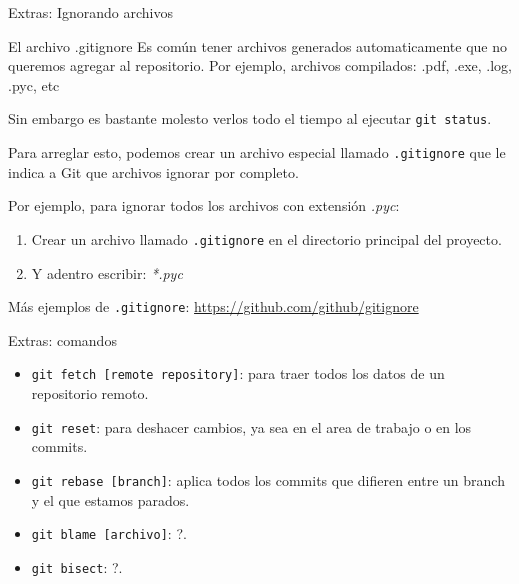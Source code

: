 \begin{frame}[t]{Extras: Ignorando archivos}

    \begin{block}{El archivo .gitignore}
      Es común tener archivos generados automaticamente que no queremos agregar al repositorio. Por ejemplo, archivos compilados: .pdf, .exe, .log, .pyc, etc

      Sin embargo es bastante molesto verlos todo el tiempo al ejecutar \texttt{git status}.

      Para arreglar esto, podemos crear un archivo especial llamado \texttt{.gitignore} que le indica a Git que archivos ignorar por completo.
    \end{block}

    \pause
    \begin{resumen}{}
      Por ejemplo, para ignorar todos los archivos con extensión \textit{.pyc}:
      \begin{enumerate}
        \item Crear un archivo llamado \texttt{.gitignore} en el directorio principal del proyecto.
        \item Y adentro escribir: \textit{*.pyc}
      \end{enumerate}
      Más ejemplos de \texttt{.gitignore}: \url{https://github.com/github/gitignore}
    \end{resumen}


\end{frame}

\begin{frame}[t]{Extras: comandos}

    \begin{itemize}
        \item \texttt{git fetch [remote repository]}: para traer todos los datos de un repositorio remoto.
        \item \texttt{git reset}: para deshacer cambios, ya sea en el area de trabajo o en los commits.
        \item \texttt{git rebase [branch]}: aplica todos los commits que difieren entre un branch y el que estamos parados.
        \item \texttt{git blame [archivo]}: ?.
        \item \texttt{git bisect}: ?.
    \end{itemize}

\end{frame}

